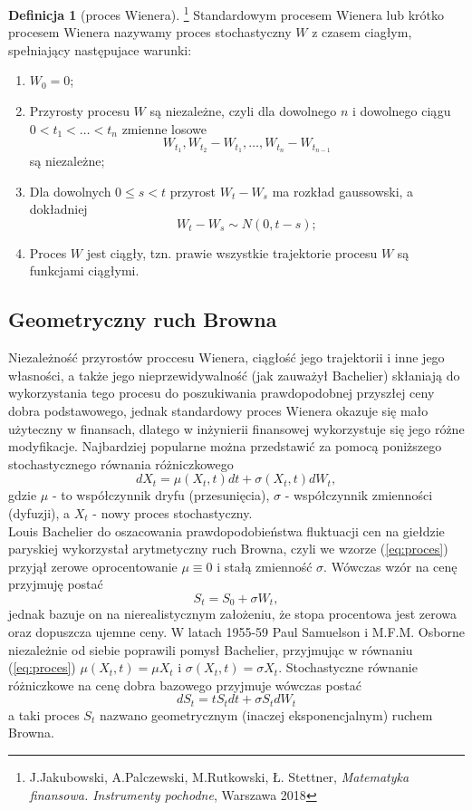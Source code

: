 \documentclass[]{pwr_wmat_praca_dyplomowa}
\theoremstyle{plain}
\numberwithin{theorem}{chapter}
\theoremstyle{definition}
\numberwithin{theorem}{chapter}
\newtheorem{definition}[theorem]{Definicja}
\begin{document}
\begin{definition}[proces Wienera]\footnote{J.Jakubowski, A.Palczewski, M.Rutkowski, Ł. Stettner, \textit{Matematyka finansowa. Instrumenty pochodne}, Warszawa 2018}
Standardowym procesem Wienera lub krótko procesem Wienera nazywamy proces stochastyczny $W$ z czasem ciagłym, spełniający następujace warunki:
\begin{enumerate}
\item $W_0 = 0$;
\item Przyrosty procesu $W$ są niezależne, czyli dla dowolnego $n$ i dowolnego ciągu $0<t_1<\ldots<t_n$ zmienne losowe
$$ W_{t_1}, W_{t_2}-W_{t_1},\ldots, W_{t_n} - W_{t_{n-1}}$$
są niezależne;
\item Dla dowolnych $0\leq s < t$ przyrost $W_t-W_s$ ma rozkład gaussowski, a dokładniej
$$ W_t - W_s \sim N(0,t-s);$$
\item Proces $W$ jest ciągły, tzn. prawie wszystkie trajektorie procesu $W$ są funkcjami ciągłymi.
\end{enumerate}
\end{definition}

\subsection{Geometryczny ruch Browna}
Niezależność przyrostów proccesu Wienera, ciągłość jego trajektorii i inne jego własności, a także jego nieprzewidywalność (jak zauważył Bachelier) skłaniają do wykorzystania tego procesu do poszukiwania prawdopodobnej przyszłej ceny dobra podstawowego, jednak standardowy proces Wienera okazuje się mało użyteczny w finansach, dlatego w inżynierii finansowej wykorzystuje się jego różne modyfikacje. Najbardziej popularne można przedstawić za pomocą poniższego stochastycznego równania różniczkowego
\begin{equation}
\label{eq:proces}
dX_t = \mu(X_t,t)dt + \sigma(X_t,t)dW_t,
\end{equation}
gdzie $\mu$ - to współczynnik dryfu (przesunięcia), $\sigma$ - współczynnik zmienności (dyfuzji), a $X_t$ - nowy proces stochastyczny.\\

Louis Bachelier do oszacowania prawdopodobieństwa fluktuacji cen na giełdzie paryskiej wykorzystał arytmetyczny ruch Browna, czyli we wzorze (\ref{eq:proces}) przyjął zerowe oprocentowanie $\mu \equiv 0$ i stałą zmienność $\sigma$. Wówczas wzór na cenę przyjmuję postać $$ S_t = S_0 + \sigma W_t,$$ jednak bazuje on na nierealistycznym założeniu, że stopa procentowa jest zerowa oraz dopuszcza ujemne ceny. W latach 1955-59 Paul Samuelson i M.F.M. Osborne niezależnie od siebie poprawili pomysł Bachelier, przyjmując w równaniu (\ref{eq:proces}) $\mu(X_t,t)=\mu X_t$ i $\sigma(X_t,t)=\sigma X_t$. Stochastyczne równanie różniczkowe na cenę dobra bazowego przyjmuje wówczas postać
\begin{equation}
\label{eq:dSt}
dS_t = t S_t dt + \sigma S_t dW_t
\end{equation}
a taki proces $S_t$ nazwano geometrycznym (inaczej eksponencjalnym) ruchem Browna.
\end{document}
